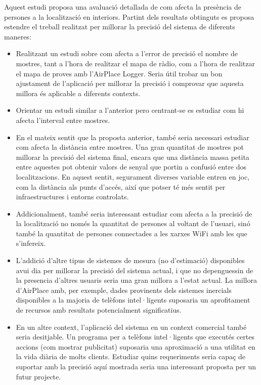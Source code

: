 
Aquest estudi proposa una avaluació detallada de com afecta la presència de persones a la localització en interiors. Partint dels resultats obtinguts es proposa estendre el treball realitzat per millorar la precisió del sistema de diferents maneres:

\begin{itemize}
    \item Realitzant un estudi sobre com afecta a l'error de precisió el nombre de mostres, tant a l'hora de realitzar el mapa de ràdio, com a l'hora de realitzar el mapa de proves amb l'AirPlace Logger. Seria útil trobar un bon ajustament de l'aplicació per millorar la precisió i comprovar que aquesta millora és aplicable a diferents contexts.
    \item Orientar un estudi similar a l'anterior pero centrant-se es estudiar com hi afecta l'interval entre mostres.
    \item En el mateix sentit que la proposta anterior, també seria necessari estudiar com afecta la distància entre mostres. Una gran quantitat de mostres pot millorar la precisió del sistema final, encara que una distància massa petita entre aquestes pot obtenir valors de senyal que portin a confusió entre dos localitzacions. En aquest sentit, segurament diverses variable entren en joc, com la distància als punts d'accés, així que potser té més sentit per infraestructures i entorns controlats.
    \item Addicionalment, també seria interessant estudiar com afecta a la precisió de la localització no només la quantitat de persones al voltant de l'usuari, sinó també la quantitat de persones connectades a les xarxes WiFi amb les que s'infereix.
    \item L'addició d'altre tipus de sistemes de mesura (no d'estimació) disponibles avui dia per millorar la precisió del sistema actual, i que no depenguessin de la presencia d'altres usuaris seria una gran millora a l'estat actual. La millora d'AirPlace amb, per exemple, dades provinents dels sistemes inercials disponibles a la majoria de telèfons intel·ligents suposaria un aprofitament de recursos amb resultats potencialment significatius.
    \item En un altre context, l'aplicació del sistema en un context comercial també seria desitjable. Un programa per a telèfons intel·ligents que executés certes accions (com mostrar publicitat) suposaria una aproximació a una utilitat en la vida diària de molts clients. Estudiar quins requeriments seria capaç de suportar amb la precisió aquí mostrada seria una interessant proposta per un futur projecte.
\end{itemize}

